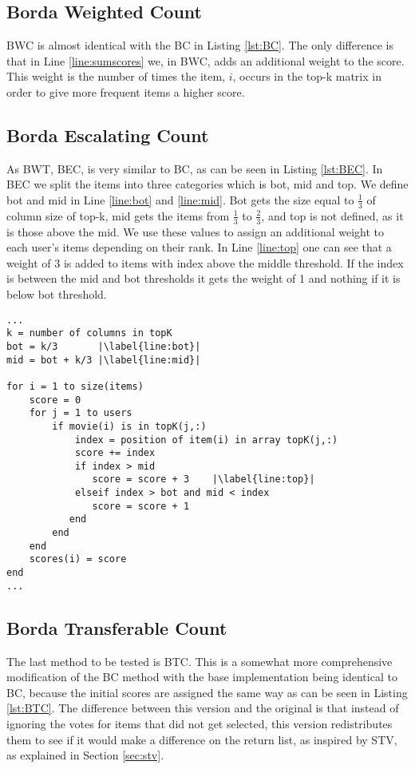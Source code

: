 \subsection{Borda Weighted Count}
BWC is almost identical with the BC in Listing \ref{lst:BC}. The only difference is that in Line \ref{line:sumscores} we, in BWC, adds an additional weight to the score. This weight is the number of times the item, $i$, occurs in the top-k matrix in order to give more frequent items a higher score.

\subsection{Borda Escalating Count}
As BWT, BEC, is very similar to BC, as can be seen in Listing \ref{lst:BEC}. In BEC we split the items into three categories which is bot, mid and top. We define bot and mid in Line \ref{line:bot} and \ref{line:mid}. Bot gets the size equal to $\frac{1}{3}$ of column size of top-k, mid gets the items from $\frac{1}{3}$ to $\frac{2}{3}$, and top is not defined, as it is those above the mid. We use these values to assign an additional weight to each user's items depending on their rank. In Line \ref{line:top} one can see that a weight of 3 is added to items with index above the middle threshold. If the index is between the mid and bot thresholds it gets the weight of 1 and nothing if it is below bot threshold.
\begin{lstlisting}[caption={Borda escalating count implementation},label=lst:BEC, firstnumber=7,escapechar=|]
...
k = number of columns in topK
bot = k/3 		|\label{line:bot}|
mid = bot + k/3	|\label{line:mid}|

for i = 1 to size(items)
	score = 0
	for j = 1 to users
		if movie(i) is in topK(j,:)
			index = position of item(i) in array topK(j,:)
			score += index
			if index > mid			
               score = score + 3	|\label{line:top}|
           	elseif index > bot and mid < index
               score = score + 1
           end 
		end
	end
	scores(i) = score
end
...
\end{lstlisting}

\subsection{Borda Transferable Count} \label{sec:BTC}
The last method to be tested is BTC. This is a somewhat more comprehensive modification of the BC method with the base implementation being identical to BC, because the initial scores are assigned the same way as can be seen in Listing \ref{lst:BTC}. The difference between this version and the original is that instead of ignoring the votes for items that did not get selected, this version redistributes them to see if it would make a difference on the return list, as inspired by STV, as explained in Section \ref{sec:stv}.

